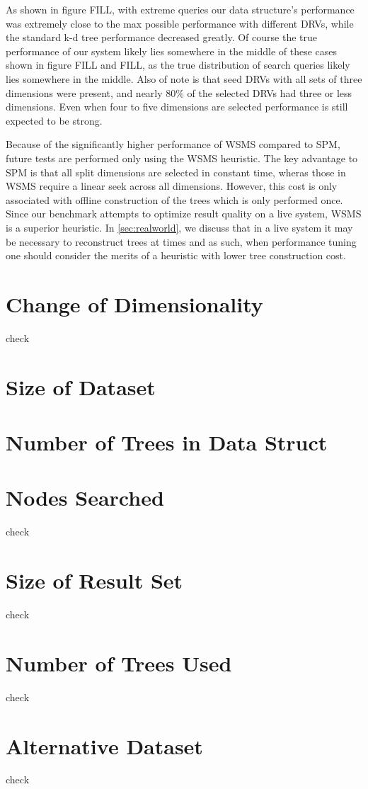As shown in figure FILL, with extreme queries our data structure's performance was extremely close to the max possible performance with different DRVs, while the standard k-d tree performance decreased greatly.  Of course the true performance of our system likely lies somewhere in the middle of these cases shown in figure FILL and FILL, as the true distribution of search queries likely lies somewhere in the middle.  Also of note is that seed DRVs with all sets of three dimensions were present, and nearly 80\% of the selected DRVs had three or less dimensions.  Even when four to five dimensions are selected performance is still expected to be strong.

Because of the significantly higher performance of WSMS compared to SPM, future tests are performed only using the WSMS heuristic.  The key advantage to SPM is that all split dimensions are selected in constant time, wheras those in WSMS require a linear seek across all dimensions.  However, this cost is only associated with offline construction of the trees which is only performed once.  Since our benchmark attempts to optimize result quality on a live system, WSMS is a superior heuristic.  In \ref{sec:realworld}, we discuss that in a live system it may be necessary to reconstruct trees at times and as such, when performance tuning one should consider the merits of a heuristic with lower tree construction cost.

\section{Change of Dimensionality}

check

\section{Size of Dataset}



\section{Number of Trees in Data Struct}



\section{Nodes Searched}

check

\section{Size of Result Set}

check

\section{Number of Trees Used}

check


\section{Alternative Dataset}

check
